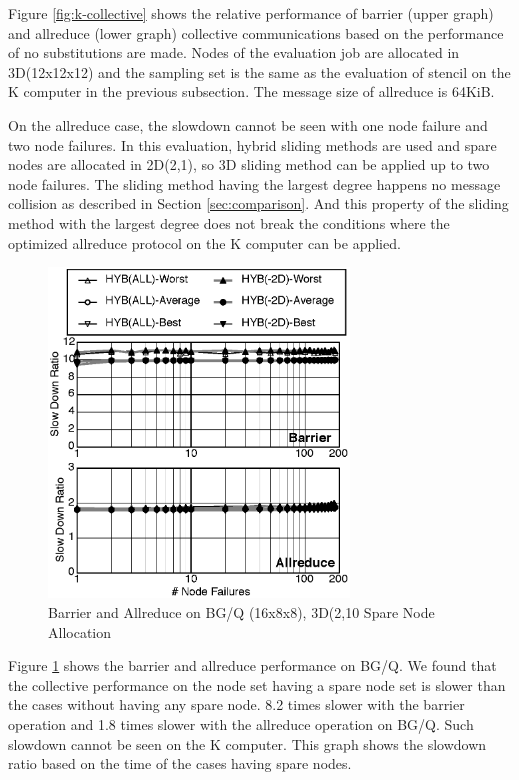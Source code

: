 \documentclass[Afour,times,sagev]{sagej}
\begin{document}
Figure \ref{fig:k-collective} shows the relative performance of
barrier (upper graph) and allreduce (lower graph) collective
communications based on the performance of no substitutions are
made. Nodes of the evaluation job are allocated in 3D(12x12x12) and
the sampling set is the same as the evaluation of stencil on the
K computer in the previous subsection. The message size of allreduce
is 64KiB. 

On the allreduce case, the slowdown cannot be seen with one node
failure and two node failures. In this evaluation, hybrid sliding 
methods are used and spare nodes are allocated in 2D(2,1), so 3D
sliding method can be applied up to two node failures. The sliding
method having the largest degree happens no message collision as
described in Section \ref{sec:comparison}. And this property of
the sliding method with the largest degree does not break the
conditions where the optimized allreduce protocol on the K computer
can be applied. 

\begin{figure}[ht]
\centering
\includegraphics[width=80mm]{Figs/BGQ-Collective.eps}
  \caption{Barrier and Allreduce on BG/Q (16x8x8), 3D(2,10 Spare Node
    Allocation}
  \label{fig:bgq-collective}
\end{figure}

Figure \ref{fig:bgq-collective} shows the barrier and allreduce
performance on BG/Q. We found that the collective performance on
the node set having a spare node set is slower than the cases without
having any spare node. 8.2 times slower with the barrier operation and
1.8 times slower with the allreduce operation on BG/Q. Such slowdown
cannot be seen on the K computer. This graph shows the slowdown ratio
based on the time of the cases having spare nodes.
\end{document}
